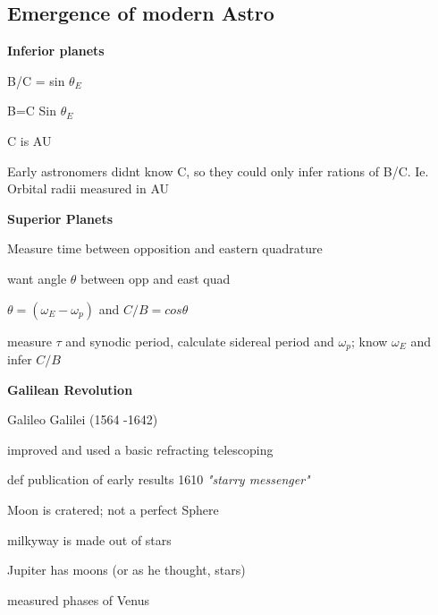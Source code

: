 \documentclass{article}
\begin{document}
\subsection{\textbf{\large Emergence of modern Astro}}

\textbf{\large Inferior planets}

\begin{list}{-}{}
\item B/C = sin $\theta_{E}$
\item B=C Sin $\theta_{E}$
\item C is AU 
\item Early astronomers didnt know C, so they could only infer rations of B/C. Ie. Orbital radii measured in AU
\end{list}

\noindent
\textbf{\large Superior Planets}

\begin{list}{-}{}
\item Measure time between opposition and eastern quadrature
\item want angle $\theta$ between opp and east quad 
\item $\theta = (\omega_{E} - \omega_{p})$ and $C/B =cos\theta$
\item measure $\tau$ and synodic period, calculate sidereal period and $\omega_{p}$; know $\omega_{E}$ and infer $C/B$
\end{list}

\noindent \textbf{\large Galilean Revolution}
\begin{list}{-}{}
\item Galileo Galilei (1564 -1642)
\item \begin{list}{-}{}
\item improved and used a basic refracting telescoping

\end{list}
\item def publication of early results 1610 \textit{"starry messenger"}
\item \begin{list}{-}{}
\item Moon is cratered; not a perfect Sphere
\item milkyway is made out of stars
\item Jupiter has moons (or as he thought, stars)
\item measured phases of Venus 
\end{list}
\end{list}
\end{document}
